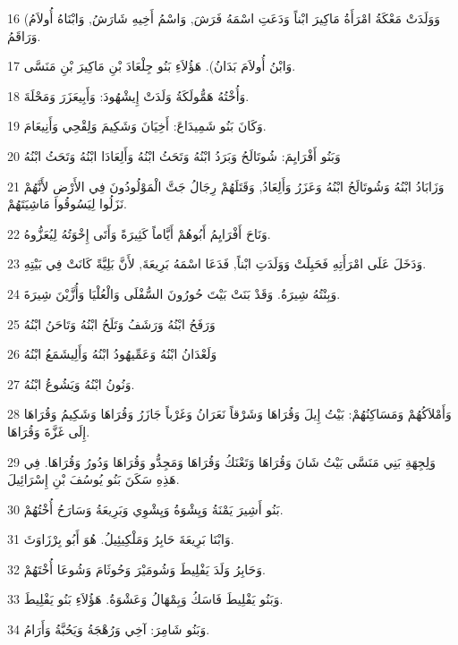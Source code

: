 \par 16 (وَوَلَدَتْ مَعْكَةُ امْرَأَةُ مَاكِيرَ ابْناً وَدَعَتِ اسْمَهُ فَرَشَ, وَاسْمُ أَخِيهِ شَارَشُ, وَابْنَاهُ أُولاَمُ وَرَاقَمُ.
\par 17 وَابْنُ أُولاَمَ بَدَانُ). هَؤُلاَءِ بَنُو جِلْعَادَ بْنِ مَاكِيرَ بْنِ مَنَسَّى.
\par 18 وَأُخْتُهُ هَمُّولَكَةُ وَلَدَتْ إِيشْهُودَ: وَأَبِيعَزَرَ وَمَحْلَةَ.
\par 19 وَكَانَ بَنُو شَمِيدَاعَ: أَخِيَانَ وَشَكِيمَ وَلِقْحِي وَأَنِيعَامَ.
\par 20 وَبَنُو أَفْرَايِمَ: شُوتَالَحُ وَبَرَدُ ابْنُهُ وَتَحَثُ ابْنُهُ وَأَلِعَادَا ابْنُهُ وَتَحَثُ ابْنُهُ
\par 21 وَزَابَادُ ابْنُهُ وَشُوتَالَحُ ابْنُهُ وَعَزَرُ وَأَلِعَادُ, وَقَتَلَهُمْ رِجَالُ جَتَّ الْمَوْلُودُونَ فِي الأَرْضِ لأَنَّهُمْ نَزَلُوا لِيَسُوقُوا مَاشِيَتَهُمْ.
\par 22 وَنَاحَ أَفْرَايِمُ أَبُوهُمْ أَيَّاماً كَثِيرَةً وَأَتَى إِخْوَتُهُ لِيُعَزُّوهُ.
\par 23 وَدَخَلَ عَلَى امْرَأَتِهِ فَحَبِلَتْ وَوَلَدَتِ ابْناً, فَدَعَا اسْمَهُ بَرِيعَةَ, لأَنَّ بَلِيَّةً كَانَتْ فِي بَيْتِهِ.
\par 24 وَبِنْتُهُ شِيرَةُ. وَقَدْ بَنَتْ بَيْتَ حُورُونَ السُّفْلَى وَالْعُلْيَا وَأُزَّيْنَ شِيرَةَ.
\par 25 وَرَفَحُ ابْنُهُ وَرَشَفُ وَتَلَحُ ابْنُهُ وَتَاحَنُ ابْنُهُ
\par 26 وَلَعْدَانُ ابْنُهُ وَعَمِّيهُودُ ابْنُهُ وَأَلِيشَمَعُ ابْنُهُ
\par 27 وَنُونُ ابْنُهُ وَيَشُوعُ ابْنُهُ.
\par 28 وَأَمْلاَكُهُمْ وَمَسَاكِنُهُمْ: بَيْتُ إِيلَ وَقُرَاهَا وَشَرْقاً نَعَرَانُ وَغَرْباً جَازَرُ وَقُرَاهَا وَشَكِيمُ وَقُرَاهَا إِلَى غَزَّةَ وَقُرَاهَا.
\par 29 وَلِجِهَةِ بَنِي مَنَسَّى بَيْتُ شَانَ وَقُرَاهَا وَتَعْنَكُ وَقُرَاهَا وَمَجِدُّو وَقُرَاهَا وَدُورُ وَقُرَاهَا. فِي هَذِهِ سَكَنَ بَنُو يُوسُفَ بْنِ إِسْرَائِيلَ.
\par 30 بَنُو أَشِيرَ يَمْنَةُ وَيِشْوَةُ وَيِشْوِي وَبَرِيعَةُ وَسَارَحُ أُخْتُهُمْ.
\par 31 وَابْنَا بَرِيعَةَ حَابِرُ وَمَلْكِيئِيلُ. هُوَ أَبُو بِرْزَاوَثَ.
\par 32 وَحَابِرُ وَلَدَ يَفْلِيطَ وَشُومَيْرَ وَحُوثَامَ وَشُوعَا أُخْتَهُمْ.
\par 33 وَبَنُو يَفْلِيطَ فَاسَكُ وَبِمْهَالُ وَعَشْوَةُ. هَؤُلاَءِ بَنُو يَفْلِيطَ.
\par 34 وَبَنُو شَامِرَ: آخِي وَرُهْجَةُ وَيَحُبَّةُ وَأَرَامُ.
